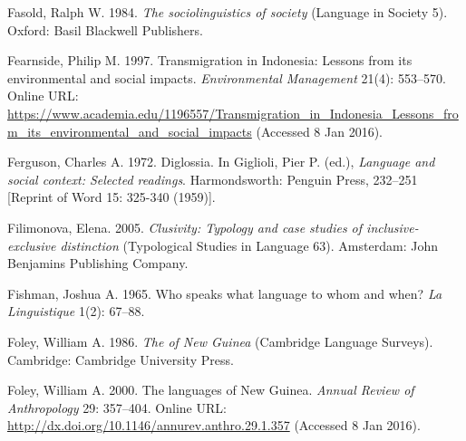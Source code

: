 \begin{styleCitaviBibliographyEntry}
Fasold, Ralph W. 1984. \textit{The sociolinguistics of society} (Language in Society 5). Oxford: Basil Blackwell Publishers.
\end{styleCitaviBibliographyEntry}

\begin{styleCitaviBibliographyEntry}
Fearnside, Philip M. 1997. Transmigration in Indonesia: Lessons from its environmental and social impacts. \textit{Environmental Management} 21(4): 553–570. Online URL: \url{https://www.academia.edu/1196557/Transmigration_in_Indonesia_Lessons_from_its_environmental_and_social_impacts} (Accessed 8 Jan 2016).
\end{styleCitaviBibliographyEntry}

\begin{styleCitaviBibliographyEntry}
Ferguson, Charles A. 1972. Diglossia. In Giglioli, Pier P. (ed.), \textit{Language and social context: Selected readings}. Harmondsworth: Penguin Press, 232–251 [Reprint of Word 15: 325-340 (1959)].
\end{styleCitaviBibliographyEntry}

\begin{styleCitaviBibliographyEntry}
Filimonova, Elena. 2005. \textit{Clusivity: Typology and case studies of inclusive-exclusive distinction} (Typological Studies in Language 63). Amsterdam: John Benjamins Publishing Company.
\end{styleCitaviBibliographyEntry}

\begin{styleCitaviBibliographyEntry}
Fishman, Joshua A. 1965. Who speaks what language to whom and when? \textit{La Linguistique} 1(2): 67–88.
\end{styleCitaviBibliographyEntry}

\begin{styleCitaviBibliographyEntry}
Foley, William A. 1986. \textit{The  of New Guinea} (Cambridge Language Surveys). Cambridge: Cambridge University Press.
\end{styleCitaviBibliographyEntry}

\begin{styleCitaviBibliographyEntry}
Foley, William A. 2000. The languages of New Guinea. \textit{Annual Review of Anthropology} 29: 357–404. Online URL: \url{http://dx.doi.org/10.1146/annurev.anthro.29.1.357} (Accessed 8 Jan 2016).
\end{styleCitaviBibliographyEntry}

